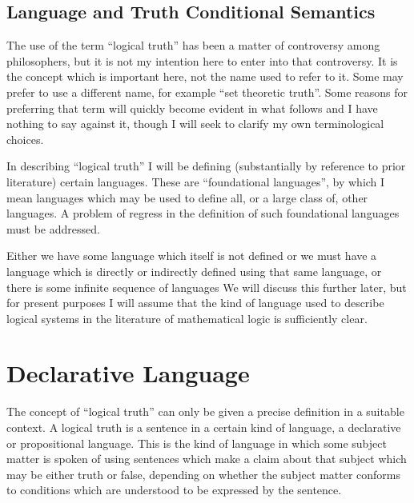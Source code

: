 \documentclass[10pt,titlepage]{book}
\newcommand{\ignore}[1]{}
\begin{document}
\subsection{Language and Truth Conditional Semantics}

The use of the term ``logical truth'' has been a matter of controversy among philosophers, but it is not my intention here to enter into that controversy.
It is the concept which is important here, not the name used to refer to it.
Some may prefer to use a different name, for example ``set theoretic truth''.
Some reasons for preferring that term will quickly become evident in what follows and I have nothing to say against it, though I will seek to clarify my own terminological choices.


\ignore{
One of those reasons is the related distinction between propositions which make a substantive claim about the material world, and those which do not, but which may be seen to be true or false independently of material reality.
Typical of the latter category are the theorems of mathematics, and all propositions which speak only of abstract entities, i.e. of entities which are located in space or time, and are causally independent of the material world.
}%


In describing ``logical truth'' I will be defining (substantially by reference to prior literature) certain languages.
These are ``foundational languages'', by which I mean languages which may be used to define all, or a large class of, other languages.
A problem of regress in the definition of such foundational languages must be addressed.

Either we have some language which itself is not defined or we must have a language which is directly or indirectly defined using that same language, or there is some infinite sequence of languages
We will discuss this further later, but for present purposes I will assume that the kind of language used to describe logical systems in the literature of mathematical logic is sufficiently clear.

\section{Declarative Language}

The concept of ``logical truth'' can only be given a precise definition in a suitable context.
A logical truth is a sentence in a certain kind of language, a declarative or propositional language.
This is the kind of language in which some subject matter is spoken of using sentences which make a claim about that subject which may be either truth or false, depending on whether the subject matter conforms to conditions which are understood to be expressed by the sentence.
\end{document}
